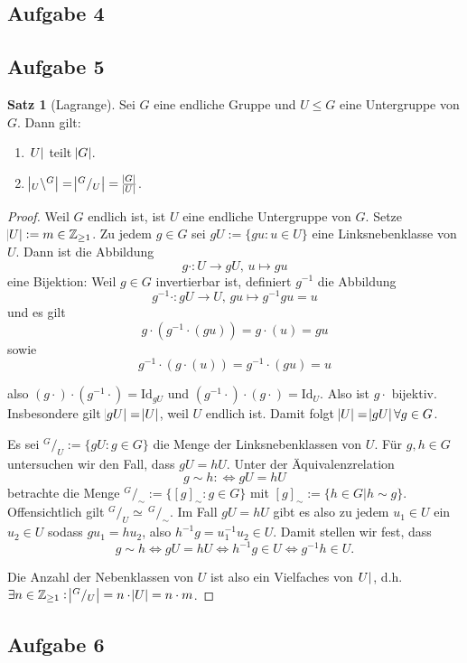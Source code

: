 \documentclass[a4paper,12pt,twoside]{article}
\theoremstyle{definition}
\newtheorem{satz}{Satz}[subsection]
\begin{document}
\subsection{Aufgabe 4}

\subsection{Aufgabe 5}
\begin{satz}[Lagrange]
Sei $G$ eine endliche Gruppe und $U \leq G$ eine Untergruppe von $G$. Dann gilt:
\begin{enumerate}
\renewcommand{\labelenumi}{(\theenumi)}
\item $\abs{U}$ teilt $\abs{G}$.
\item $\abs{_U \backslash ^G} = \abs{^G/_U} = \frac{\abs{G}}{\abs{U}}$.
\end{enumerate}
\end{satz}
\begin{proof}
Weil $G$ endlich ist, ist $U$ eine endliche Untergruppe von $G$. Setze $\abs{U} := m \in \mathbb{Z}_{\geq1}$. Zu jedem $g \in G$ sei
$gU := \{ gu : u \in U \}$ eine Linksnebenklasse von $U$.
Dann ist die Abbildung
\[
g\cdot : U \rightarrow gU,\, u \mapsto gu
\]
eine Bijektion: Weil $g \in G$ invertierbar ist, definiert $g^{-1}$ die Abbildung
\[
g^{-1}\cdot : gU \rightarrow U,\, gu \mapsto g^{-1}gu = u
\]
und es gilt
\[
g\cdot ( g^{-1}\cdot( gu ) ) = g\cdot ( u ) = gu
\]
sowie
\[
g^{-1}\cdot( g\cdot( u ) ) = g^{-1}\cdot( gu ) = u
\]

also $(g\cdot)\cdot(g^{-1}\cdot) = \mathrm{Id}_{gU}$ und $(g^{-1}\cdot)\cdot(g\cdot) = \mathrm{Id}_{U}$.
Also ist $g\cdot$ bijektiv. Insbesondere gilt $\abs{gU} = \abs{U}$, weil $U$ endlich ist.
Damit folgt $\abs{U} = \abs{gU} \forall g \in G$. 

Es sei $^G/_U := \{ gU : g \in G \}$ die Menge der Linksnebenklassen von $U$.
Für $g, h \in G$ untersuchen wir den Fall, dass $gU = hU$.
Unter der Äquivalenzrelation
\[
g \sim h :\Leftrightarrow gU = hU
\]
betrachte die Menge $^G/_\sim := \{ [g]_\sim : g \in G \}$ mit $[g]_\sim := \{ h \in G | h \sim g \}$. Offensichtlich gilt $^G/_U \simeq \,^G/_\sim$.
Im Fall $gU = hU$ gibt es also zu jedem $u_{1} \in U$ ein $u_{2} \in U$ sodass $gu_{1} = hu_{2}$, also $h^{-1}g = u_{1}^{-1}u_{2} \in U$. Damit
stellen wir fest, dass
\[
g \sim h \Leftrightarrow gU = hU \Leftrightarrow h^{-1}g \in U \Leftrightarrow g^{-1}h \in U.
\]


Die Anzahl der Nebenklassen von $U$ ist also ein Vielfaches von $\abs{U}$, d.h. $\exists n \in \mathbb{Z}_{\geq1} : \abs{^G/_U} = n\cdot \abs{U} = n\cdot m$.

\end{proof}

\subsection{Aufgabe 6}

\end{document}
